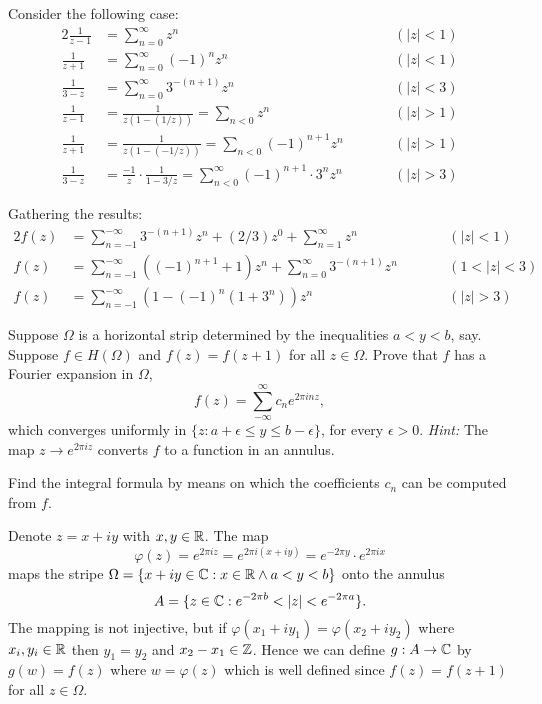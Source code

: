 \begin{enumerate}
Consider the following case:
\begin{alignat*}{2}
\frac{1}{z-1} &= \sum_{n=0}^\infty z^n && \qquad (|z|<1) \\
\frac{1}{z+1} &= \sum_{n=0}^\infty (-1)^n z^n  && \qquad (|z|<1) \\
\frac{1}{3-z} &= \sum_{n=0}^\infty 3^{-(n+1)} z^n  && \qquad (|z|<3) \\
\frac{1}{z-1} 
 &= \frac{1}{z(1-(1/z))} = 
  \sum_{n<0} z^n && \qquad (|z|>1) \\
\frac{1}{z+1} 
 &= \frac{1}{z(1-(-1/z))} 
 = \sum_{n<0} (-1)^{n+1} z^n && \qquad (|z|>1) \\
\frac{1}{3-z} 
  &= \frac{-1}{z} \cdot \frac{1}{1-3/z} 
  = \sum_{n<0}^\infty (-1)^{n+1}\cdot 3^{n} z^n  && \qquad (|z|>3)
\end{alignat*}

Gathering the results:
\begin{alignat*}{2}
f(z) &= \sum_{n=-1}^{-\infty} 3^{-(n+1)} z^n + (2/3)z^0 + \sum_{n=1}^\infty z^n  
  & \qquad & (|z|<1) \\
f(z) &= \sum_{n=-1}^{-\infty} \left((-1)^{n+1} + 1\right)z^n + 
        \sum_{n=0}^\infty 3^{-(n+1)} z^n 
     & \qquad & (1<|z|<3) \\
f(z) &= \sum_{n=-1}^{-\infty} \left(1 - (-1)^{n}(1+3^n) \right)z^n
     & \qquad & (|z|>3)
\end{alignat*}


\begin{excopy}
Suppose \(\Omega\) is a horizontal strip determined by the inequalities
\(a<y<b\), say.
Suppose \(f\in H(\Omega)\) and \(f(z) = f(z+1)\) for all \(z\in\Omega\).
Prove that $f$ has a Fourier expansion in \(\Omega\),
\begin{equation*}
f(z) = \sum_{-\infty}^\infty c_n e^{2\pi inz},
\end{equation*}
which converges uniformly in \(\{z: a+\epsilon \leq y \leq b - \epsilon\}\),
for every \(\epsilon > 0\).
\emph{Hint:} The map \(z\to e^{2\pi i z}\) converts $f$ to a function in an 
annulus.

Find the integral formula by means on which the coefficients \(c_n\) can be 
computed from $f$.
\end{excopy}

Denote \(z=x+iy\) with \(x,y\in\mathbb{R}\). The map
\begin{equation*}
\varphi(z) = e^{2\pi i z} = e^{2\pi i (x+iy)} = e^{-2\pi y}\cdot e^{2\pi i x}
\end{equation*}
maps the stripe \(\Omega = \{x+iy\in\mathbb{C}: x\in\mathbb{R} \wedge a<y<b\}\)
onto the annulus
\begin{equation*}
A = \{z\in\mathbb{C}: e^{-2\pi b} < |z| < e^{-2\pi a}\}.
\end{equation*}
The mapping is not injective, but if \(\varphi(x_1+iy_1) = \varphi(x_2+iy_2)\)
where \(x_i,y_i\in\mathbb{R}\) then \(y_1=y_2\) and \(x_2-x_1\in\mathbb{Z}\).
Hence we can define \(g:A\to\mathbb{C}\) by \(g(w) = f(z)\) where \(w=\varphi(z)\)
which is well defined since \(f(z)=f(z+1)\) for all \(z\in\Omega\).


\end{enumerate}
